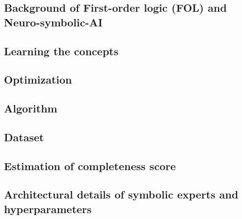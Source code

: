 \documentclass{article}
\theoremstyle{plain}
\theoremstyle{definition}
\theoremstyle{remark}
\begin{document}
\subsection{Background of First-order logic (FOL) and Neuro-symbolic-AI}
\label{app:FOL}



\subsection{Learning the concepts}
\label{app:concept_learning}



\subsection{Optimization}
\label{app:loss}


\subsection{Algorithm}
\label{app:algo}


\subsection{Dataset}
\label{app:dataset}


\subsection{Estimation of completeness score}
\label{app:completeness}


\subsection{Architectural details of symbolic experts and hyperparameters}
\label{app:g}

\end{document}

